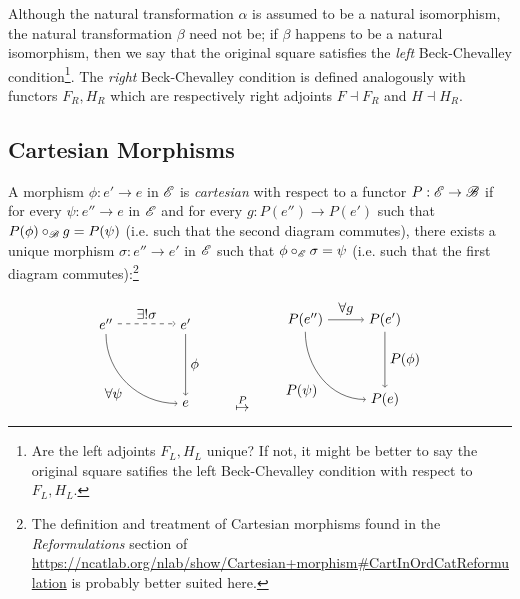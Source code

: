 \documentclass[12pt]{article}
\theoremstyle{definition}
\theoremstyle{remark}
\begin{document}
Although the natural transformation $\alpha$ is assumed to be a natural isomorphism, the natural transformation $\beta$ need not be; if $\beta$ happens to be a natural isomorphism, then we say that the original square satisfies the \textit{left} Beck-Chevalley condition\footnote{Are the left adjoints $F_L, H_L$ unique? If not, it might be better to say the original square satifies the left Beck-Chevalley condition with respect to $F_L, H_L$.}. The \textit{right} Beck-Chevalley condition is defined analogously with functors $F_R, H_R$ which are respectively right adjoints $F \dashv F_R$ and $H \dashv H_R$.

\subsection{Cartesian Morphisms}

A morphism $\phi : e' \to e$ in $\mathscr{E}$ is \textit{cartesian} with respect to a functor $P : \mathscr{E} \to \mathscr{B}$ if for every $\psi : e'' \to e$ in $\mathscr{E}$ and for every $g : P(e'') \to P(e')$ such that $ P(\phi) \circ_{\mathscr{B}} g = P(\psi)$ (i.e. such that the second diagram commutes), there exists a unique morphism $\sigma : e'' \to e'$ in $\mathscr{E}$ such that $\phi \circ_{\mathscr{E}} \sigma = \psi$ (i.e. such that the first diagram commutes):\footnote{The definition and treatment of Cartesian morphisms found in the \textit{Reformulations} section of \url{https://ncatlab.org/nlab/show/Cartesian+morphism\#CartInOrdCatReformulation} is probably better suited here.}

\[
    \begin{tikzpicture}
        \draw (-1,+1) node(tl){$e''$};
        \draw (+1,+1) node(tr){$e'$};
        \draw (+1,-1) node(br){$e$};

        \draw[dashed, ->] (tl) to node[above]{$\exists!\sigma$} (tr);
        \draw[->] (tl) to[out=-90, in=180] node[below left]{$\forall\psi$} (br);
        \draw[->] (tr) to node[right]{$\phi$} (br);
    \end{tikzpicture}
    \qquad
    \stackrel{P}{\mapsto}
    \qquad
    \begin{tikzpicture}
        \draw (-1,+1) node(tl){$P(e'')$};
        \draw (+1,+1) node(tr){$P(e')$};
        \draw (+1,-1) node(br){$P(e)$};

        \draw[->] (tl) to node[above]{$\forall g$} (tr);
        \draw[->] (tl) to[out=-90, in=180] node[below left]{$P(\psi)$} (br);
        \draw[->] (tr) to node[right]{$P(\phi)$} (br);
    \end{tikzpicture}
\]
\end{document}
